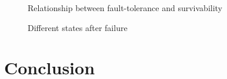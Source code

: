 \documentclass[onecolumn,conference]{IEEEtran}
\begin{document}
    \begin{figure}[htbp]
        \centering
        \caption{Relationship between fault-tolerance and survivability}
        \label{fig:3}
    \end{figure}



    \begin{figure}[htbp]
        \centering
        \caption{Different states after failure}
        \label{fig:4}
    \end{figure}



    \section{Conclusion} \label{sec:conc}
   
\end{document}
